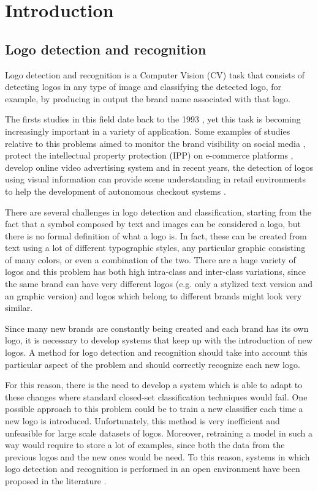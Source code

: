 \chapter{Introduction}
\label{chap:introduction}

\section{Logo detection and recognition}

Logo detection and recognition is a Computer Vision (CV) task that consists of detecting logos in any type of image and classifying the detected logo, for example, by producing in output the brand name associated with that logo. 

The firsts studies in this field date back to the 1993 \cite{doermann1993logo}, yet this task is becoming increasingly important in a variety of application. Some examples of studies relative to this problems aimed to monitor the brand visibility on social media \cite{7492197}, protect the intellectual property protection (IPP) on e-commerce platforms \cite{jin2020open}, develop online video advertising system \cite{cheng2017video} and in recent years, the detection of logos using visual information can provide scene understanding in retail environments to help the development of autonomous checkout systems \cite{mata2022standardsim}.

There are several challenges in logo detection and classification, starting from the fact that a symbol composed by text and images can be considered a logo, but there is no formal definition of what a logo is. In fact, these can be created from text using a lot of different typographic styles, any particular graphic consisting of many colors, or even a combination of the two.
There are a huge variety of logos and this problem has both high intra-class and inter-class variations, since the same brand can have very different logos (e.g. only a stylized text version and an graphic
 version) and logos which belong to different brands might look very similar.

Since many new brands are constantly being created and each brand has its own logo, it is necessary to develop systems that keep up with the introduction of new logos. A method for logo detection and recognition should take into account this particular aspect of the problem and should correctly recognize each new logo.

For this reason, there is the need to develop a system which is able to adapt to these changes where standard closed-set classification techniques would fail. One possible approach to this problem could be to train a new classifier each time a new logo is introduced. Unfortunately, this method is very inefficient and unfeasible for large scale datasets of logos. Moreover, retraining a model in such a way would require to store a lot of examples, since both the data from the previous logos and the new ones would be need. To this reason, systems in which logo detection and recognition is performed in an open environment have been proposed in the literature \cite{fehervari2019scalable,li2022seetek}.

